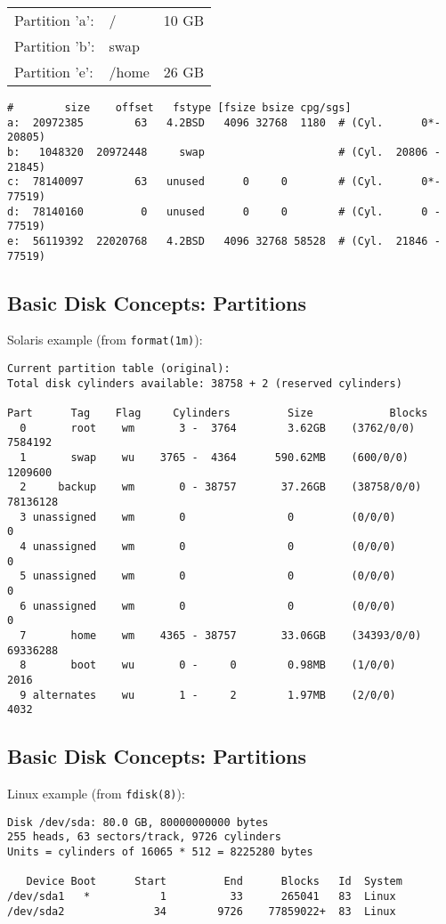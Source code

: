 \documentclass[xga]{xdvislides}
\begin{document}
\begin{tabular}{ l l c }
Partition 'a': & / & 10 GB\\
Partition 'b': & swap & \\
Partition 'e': & /home & 26 GB\\
\end{tabular}

\begin{verbatim}
#        size    offset   fstype [fsize bsize cpg/sgs]
a:  20972385        63   4.2BSD   4096 32768  1180  # (Cyl.      0*- 20805)
b:   1048320  20972448     swap                     # (Cyl.  20806 - 21845)
c:  78140097        63   unused      0     0        # (Cyl.      0*- 77519)
d:  78140160         0   unused      0     0        # (Cyl.      0 - 77519)
e:  56119392  22020768   4.2BSD   4096 32768 58528  # (Cyl.  21846 - 77519)
\end{verbatim}


\subsection{Basic Disk Concepts: Partitions}
Solaris example (from {\tt format(1m)}):
\begin{verbatim}
Current partition table (original):
Total disk cylinders available: 38758 + 2 (reserved cylinders)

Part      Tag    Flag     Cylinders         Size            Blocks
  0       root    wm       3 -  3764        3.62GB    (3762/0/0)   7584192
  1       swap    wu    3765 -  4364      590.62MB    (600/0/0)    1209600
  2     backup    wm       0 - 38757       37.26GB    (38758/0/0) 78136128
  3 unassigned    wm       0                0         (0/0/0)            0
  4 unassigned    wm       0                0         (0/0/0)            0
  5 unassigned    wm       0                0         (0/0/0)            0
  6 unassigned    wm       0                0         (0/0/0)            0
  7       home    wm    4365 - 38757       33.06GB    (34393/0/0) 69336288
  8       boot    wu       0 -     0        0.98MB    (1/0/0)         2016
  9 alternates    wu       1 -     2        1.97MB    (2/0/0)         4032
\end{verbatim}

\subsection{Basic Disk Concepts: Partitions}
Linux example (from {\tt fdisk(8)}):
\begin{verbatim}
Disk /dev/sda: 80.0 GB, 80000000000 bytes
255 heads, 63 sectors/track, 9726 cylinders
Units = cylinders of 16065 * 512 = 8225280 bytes

   Device Boot      Start         End      Blocks   Id  System
/dev/sda1   *           1          33      265041   83  Linux
/dev/sda2              34        9726    77859022+  83  Linux
\end{verbatim}
\end{document}
